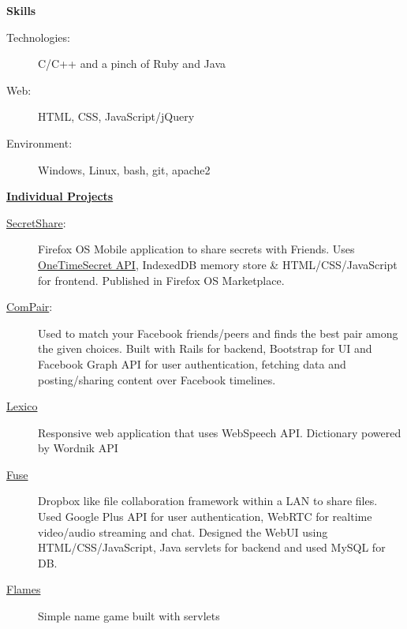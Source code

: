 \documentclass[letterpaper,11pt]{article}
\newcommand{\resheading}[1]{{\large \colorbox{mygrey}{\begin{minipage}{\textwidth}{\textbf{#1 \vphantom{p\^{E}}}}\end{minipage}}}}
\begin{document}
\resheading{{Skills}}
	\begin{description}
		\item[Technologies:] { \footnotesize C/C++ and a pinch of Ruby and Java
		}
		\item[Web:] { \footnotesize HTML, CSS, JavaScript/jQuery
		}
		\item[Environment:] { \footnotesize
			Windows, Linux, bash, git, apache2
		}

	\end{description} %

\resheading{\href{https://github.com/dtsdwarak/}{Individual Projects}}

\begin{description}
\item[\href{https://marketplace.firefox.com/app/secretshare}{SecretShare}:] { \footnotesize Firefox OS Mobile application to share secrets with Friends. Uses \href{https://onetimesecret.com/}{OneTimeSecret API}, IndexedDB memory store \& HTML/CSS/JavaScript for frontend. Published in Firefox OS Marketplace.}

\item[\href{http://compair-dtsdwarak.rhcloud.com/}{ComPair}:] { \footnotesize Used to match your Facebook friends/peers and finds the best pair among the given choices. Built with Rails for backend, Bootstrap for UI and Facebook Graph API for user authentication, fetching data and posting/sharing content over Facebook timelines.\color{red}{\bf Won the best creative appliation award at RedHat's OpenShift DevConf 2014, Czech Republic}}

\item[\href{https://dtsdwarak.github.io/lexico/}{Lexico}] { \footnotesize Responsive web application that uses WebSpeech API. Dictionary powered by Wordnik API}

\item[\href{https://github.com/dtsdwarak/fuse}{Fuse}] { \footnotesize Dropbox like file collaboration framework within a LAN to share files. Used Google Plus API for user authentication, WebRTC for realtime video/audio streaming and chat. Designed the WebUI using HTML/CSS/JavaScript, Java servlets for backend and used MySQL for DB.}

\item[\href{http://flames-dtsdwarak.rhcloud.com/}{Flames}] { \footnotesize Simple name game built with servlets}

\end{description}
\end{document}
